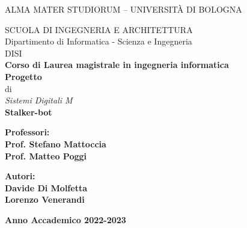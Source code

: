 \documentclass[12pt]{report}
\begin{document}
	



\pagestyle{myheadings}


\thispagestyle{empty}  
                                               
\begin{center}                                                            
    \vspace{2mm}
    {\large ALMA MATER STUDIORUM -- UNIVERSIT\`A DI BOLOGNA} \\  
                         
      \vspace{2mm}
\end{center}
\begin{center}



\end{center}
\begin{center}
      \vspace{5mm}
      {\large \uppercase{Scuola di Ingegneria e architettura}} \\
        \vspace{5mm}
       {\large Dipartimento di Informatica - Scienza e Ingegneria}\\
   		{\large DISI}\\
        \vspace{5mm}
      {\Large \bf Corso di Laurea magistrale in ingegneria informatica}\\
      \vspace{15mm}
      { \large\textbf{Progetto}\\ di\\ \textit{Sistemi Digitali M}}\\
      \vspace{5mm}
      {\LARGE\bf Stalker-bot} \\                
      \vspace{20mm}
\end{center}

\par
\noindent
\begin{minipage}[t]{0.47\textwidth}
{\large{\bf Professori:\\
Prof. Stefano Mattoccia\\ Prof. Matteo Poggi}}
\end{minipage}
\hfill
\begin{minipage}[t]{0.47\textwidth}\raggedleft
{\large{\bf Autori:\\
Davide Di Molfetta\\
Lorenzo Venerandi\\}}
\end{minipage}
\vspace{20mm}
\begin{center}
{\large{\bf Anno Accademico 2022-2023}}
\end{center}
\end{document}
